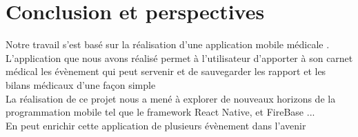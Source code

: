 \chapter{Conclusion et perspectives}
{\large


Notre travail s'est basé  sur la réalisation d'une application mobile médicale .
 L'application que nous avons réalisé permet à l'utilisateur d'apporter à son carnet médical les évènement  qui peut servenir et de sauvegarder les rapport et  
 les bilans médicaux d'une façon simple\\

 

La réalisation de ce projet nous a mené à explorer de nouveaux horizons de
la programmation mobile tel que le framework React Native, et FireBase ...
\\
En peut enrichir cette application de plusieurs évènement dans l'avenir



}
